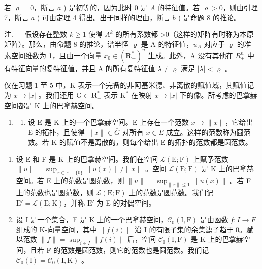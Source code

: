 若 \(\varrho = 0\)，断言 \(a\) ) 是初等的，因为此时 0 是 \(A\) 的特征值。若 \(\varrho > 0\)，则由引理 7，断言 \(a\) ) 可由定理 4 得出。出于同样的理由，断言 \(b\) ) 是命题 8 的推论。

注. --- 假设存在整数 \(k \geqslant 1\) 使得 \(A^{k}\) 的所有系数都 \textgreater0（这样的矩阵有时称为本原矩阵）。那么，由命题 8 的推论，谱半径 \(\varrho\) 是 A 的特征值，\(u_{A}\) 对应于 \(\varrho\) 的准素空间维数为 1，且由一个向量 \(x_{0} \in (\mathbf{R}_{+}^{*})^{n}\) 生成。此外，A 没有其他在 \(R_{+}^{n}\) 中有特征向量的复特征值，并且 A 的所有复特征值 \(\lambda \neq \varrho\) 满足 \(|\lambda| < \varrho\) 。


\exercisesection{}

仅在习题 1 至 5 中，K 表示一个完备的非阿基米德、非离散的赋值域，其赋值记为 \(x \mapsto |x|\) 。我们还用 \(\mathrm{G} \subset \mathbf{R}_{+}^{*}\) 表示 \(\mathrm{K}^{*}\) 在映射 \(x \mapsto |x|\) 下的像。所考虑的巴拿赫空间都是 \(\mathrm{K}\) 上的巴拿赫空间。

\begin{enumerate}
\def\labelenumi{\arabic{enumi})}
\tightlist
\item
  \begin{enumerate}
  \def\labelenumii{\alph{enumii})}
  \tightlist
  \item
    设 E 是 K 上的一个巴拿赫空间。E 上存在一个范数 \(x \mapsto \|x\|\)，它给出 E 的拓扑，且使得 \(\|x\| \in \overline{G}\) 对所有 \(x \in E\) 成立。这样的范数称为圆范数。若 K 的赋值不是离散的，则每个给出 E 的拓扑的范数都是圆范数。
  \end{enumerate}
\end{enumerate}

\begin{enumerate}
\def\labelenumi{\alph{enumi})}
\setcounter{enumi}{1}
\item
  设 E 和 F 是 K 上的巴拿赫空间。我们在空间 \(\mathcal{L}(\mathrm{E};\mathrm{F})\) 上赋予范数 \(\| u\| = \sup_{x\in \mathrm{E}- \{0\}}\| u(x)\| /\| x\|\) 。空间 \(\mathcal{L}(\mathrm{E};\mathrm{F})\) 是 K 上的巴拿赫空间。若 E 上的范数是圆范数，则 \(\| u\| = \sup_{\| x\| \leqslant 1}\| u(x)\|\) 。若 F 上的范数也是圆范数，则 \(\mathcal{L}(\mathrm{E};\mathrm{F})\) 上的范数是圆范数。我们记 \(\mathrm{E}' = \mathcal{L}(\mathrm{E};\mathrm{K})\)，并称 \(\mathrm{E}'\) 为 E 的对偶空间。
\item
  设 I 是一个集合，F 是 K 上的一个巴拿赫空间，\(\mathcal{C}_{0}(\mathrm{I},\mathrm{F})\) 是由函数 \(f\colon I\to F\) 组成的 K-向量空间，其中 \(\|f(i)\|\) 沿 I 的有限子集的余集滤子趋于 0。赋以范数 \(\|f\|=\sup_{i\in I}\|f(i)\|\) 后，空间 \(\mathcal{C}_{0}(\mathrm{I},\mathrm{F})\) 是 K 上的巴拿赫空间，且若 F 的范数是圆范数，则它的范数也是圆范数。我们记 \(\mathcal{C}_{0}(\mathrm{I})=\mathcal{C}_{0}(\mathrm{I},\mathrm{K})\) 。
\end{enumerate}

